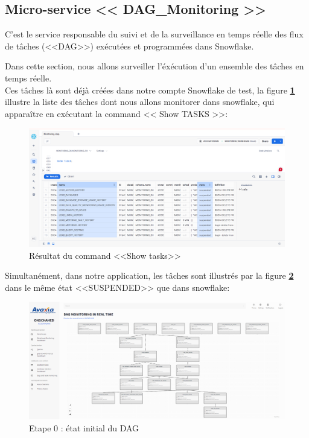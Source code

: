 \subsection{Micro-service << DAG\_Monitoring >>}
\par C'est le service responsable du suivi et de la surveillance en temps réelle des flux de tâches (<<DAG>>) exécutées et programmées dans Snowflake. 
\par Dans cette section, nous allons surveiller l'éxécution d'un ensemble des tâches en temps réelle. 
\\ Ces tâches là sont déjà créées dans notre compte Snowflake de test, la figure \textbf{\ref{fig:show}} illustre la liste des tâches dont nous allons monitorer dans snowflake, qui apparaître en exécutant la command << Show TASKS >>:
    \begin{figure}[H]
        \centering
        \includegraphics[width =1\linewidth]{img/captures/dag/show.PNG}
        \caption{Résultat du command <<Show tasks>> }
        \label{fig:show}
    \end{figure}
\par Simultanément, dans notre application, les tâches sont illustrés par la figure \textbf{\ref{fig:sus}} dans le même état <<SUSPENDED>> que dans snowflake:
    \begin{figure}[H]
        \centering
        \includegraphics[width =1\linewidth]{img/captures/dag/1/ok/0.png}
        \caption{Etape 0 : état initial du DAG}
        \label{fig:sus}
    \end{figure}
